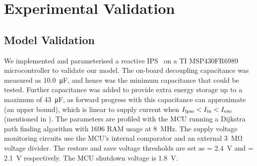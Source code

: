 
\section{Experimental Validation} \label{sec:c3_experiment}

\subsection{Model Validation} 


We implemented and parameterised a reactive IPS~\cite{balsamo2015hibernus} on a TI MSP430FR6989 microcontroller to validate our model. 
The on-board decoupling capacitance was measured as \SI{10.0}{\micro\farad}, and hence was the minimum capacitance that could be tested. 
Further capacitance was added to provide extra energy storage up to a maximum of \SI{43}{\micro\farad}, as forward progress with this capacitance can approximate  (an upper bound), which is linear to supply current  when $I_{\text{lpm}} < I_{\text{in}} < I_{\text{exe}}$ (mentioned in ).
The parameters are profiled with the MCU running a Dijkstra path finding algorithm with \SI{1696}{\byte} RAM usage at \SI{8}{\mega\hertz}. 
The supply voltage monitoring circuits use the MCU's internal comparator and an external \SI{3}{\mega\ohm} voltage divider. 
The restore and save voltage thresholds are set as  = \SI{2.4}{\volt} and  = \SI{2.1}{\volt} respectively. 
The MCU shutdown voltage  is \SI{1.8}{\volt}. 


